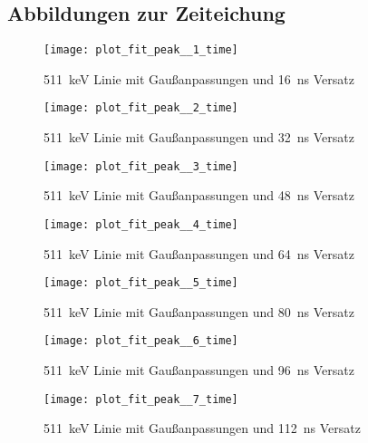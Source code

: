 \documentclass[11pt, ngerman, fleqn, DIV=15, headinclude, BCOR=2cm]{scrreprt}
\begin{document}
\begin{appendix}
\section{Abbildungen zur Zeiteichung} \label{anhang-zeiteichung}
\begin{figure}[h]
    \centering
    \texttt{[image: plot\_fit\_peak\_\_1\_time]}
    \caption{%
	    \SI{511}{\kilo\electronvolt} Linie mit
	    Gaußanpassungen und \SI{16}{\nano\second} Versatz
   }
    \label{fig:plot_fit_peak__1_time}
\end{figure}
\begin{figure}[h]
    \centering
    \texttt{[image: plot\_fit\_peak\_\_2\_time]}
    \caption{%
	    \SI{511}{\kilo\electronvolt} Linie mit
	    Gaußanpassungen und \SI{32}{\nano\second} Versatz
   }
    \label{fig:plot_fit_peak__2_time}
\end{figure}
\begin{figure}[h]
    \centering
    \texttt{[image: plot\_fit\_peak\_\_3\_time]}
    \caption{%
	    \SI{511}{\kilo\electronvolt} Linie mit
	    Gaußanpassungen und \SI{48}{\nano\second} Versatz
   }
    \label{fig:plot_fit_peak__3_time}
\end{figure}
\begin{figure}[h]
    \centering
    \texttt{[image: plot\_fit\_peak\_\_4\_time]}
    \caption{%
	    \SI{511}{\kilo\electronvolt} Linie mit
	    Gaußanpassungen und \SI{64}{\nano\second} Versatz
   }
    \label{fig:plot_fit_peak__4_time}
\end{figure}
\begin{figure}[h]
    \centering
    \texttt{[image: plot\_fit\_peak\_\_5\_time]}
    \caption{%
	    \SI{511}{\kilo\electronvolt} Linie mit
	    Gaußanpassungen und \SI{80}{\nano\second} Versatz
   }
    \label{fig:plot_fit_peak__5_time}
\end{figure}
\begin{figure}[h]
    \centering
    \texttt{[image: plot\_fit\_peak\_\_6\_time]}
    \caption{%
	    \SI{511}{\kilo\electronvolt} Linie mit
	    Gaußanpassungen und \SI{96}{\nano\second} Versatz
   }
    \label{fig:plot_fit_peak__6_time}
\end{figure}
\begin{figure}[h]
    \centering
    \texttt{[image: plot\_fit\_peak\_\_7\_time]}
    \caption{%
	    \SI{511}{\kilo\electronvolt} Linie mit
	    Gaußanpassungen und \SI{112}{\nano\second} Versatz
   }
    \label{fig:plot_fit_peak__7_time}
\end{figure}
\clearpage











\end{appendix}
\end{document}
